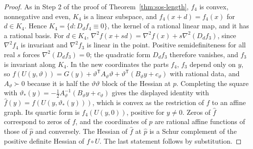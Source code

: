 \begin{proof}
As in Step 2 of the proof of Theorem~\ref{thm:sos-length}, $f_4$ is convex,
nonnegative and even, $K_4$ is a linear subspace, and $f_4(x+d)=f_4(x)$ for
$d\in K_4$. Hence $K_4=\{d:D_df_4\equiv0\}$, the kernel of a rational linear
map, and it has a rational basis. For $d\in K_4$,
$\nabla^2f(x+sd)=\nabla^2f(x)+s\nabla^2(D_df_3)$, since $\nabla^2f_4$ is
invariant and $\nabla^2f_3$ is linear in the point. Positive semidefiniteness
for all real $s$ forces $\nabla^2(D_df_3)=0$; the quadratic form $D_df_3$
therefore vanishes, and $f_3$ is invariant along $K_4$. In the new coordinates
the parts $f_4$, $f_3$ depend only on $y$, so
$f(U(y,\vartheta))=G(y)+\vartheta^{\mathsf T}A_\vartheta\vartheta
+\vartheta^{\mathsf T}(B_\vartheta y+c_\vartheta)$ with rational data, and
$A_\vartheta\succ0$ because it is half the $\vartheta\vartheta$ block of the
Hessian at $p$. Completing the square with
$\vartheta_*(y)=-\tfrac12A_\vartheta^{-1}(B_\vartheta y+c_\vartheta)$ gives the
displayed identity with $\hat f(y)=f(U(y,\vartheta_*(y)))$, which is convex as
the restriction of $f$ to an affine graph. Its quartic form is $f_4(U(y,0))$,
positive for $y\ne0$. Zeros of $\hat f$ correspond to zeros of $f$, and the
coordinates of $p$ are rational affine functions of those of $\hat p$ and
conversely. The Hessian of $\hat f$ at $\hat p$ is a Schur complement of the
positive definite Hessian of $f\circ U$. The last statement follows by
substitution.
\end{proof}

